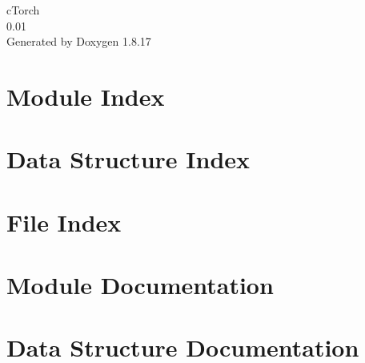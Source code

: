 \let\mypdfximage\pdfximage\def\pdfximage{\immediate\mypdfximage}\documentclass[twoside]{book}
\newcommand{\+}{\discretionary{\mbox{\scriptsize$\hookleftarrow$}}{}{}}
\newcommand{\clearemptydoublepage}{%
  \newpage{\pagestyle{empty}\cleardoublepage}%
}
\begin{document}
\hypersetup{pageanchor=false,
             bookmarksnumbered=true,
             pdfencoding=unicode
            }
\begin{titlepage}
\vspace*{7cm}
\begin{center}%
{\Large c\+Torch \\[1ex]\large 0.\+01 }\\
\vspace*{1cm}
{\large Generated by Doxygen 1.8.17}\\
\end{center}
\end{titlepage}
\clearemptydoublepage
{}
\tableofcontents
\clearemptydoublepage
{}
\hypersetup{pageanchor=true}

\chapter{Module Index}

\chapter{Data Structure Index}

\chapter{File Index}

\chapter{Module Documentation}

\chapter{Data Structure Documentation}



















\end{document}
